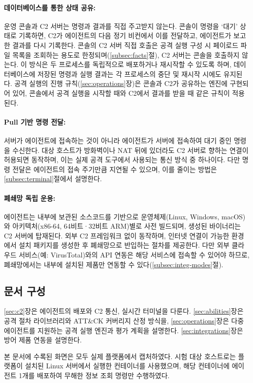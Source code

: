 \paragraph{\textbf{데이터베이스를 통한 상태 공유:}}
운영 콘솔과 C2 서버는 명령과 결과를 직접 주고받지 않는다. 콘솔이 명령을 `대기' 상태로 기록하면, C2가 에이전트의 다음 정기 비컨에서 이를 전달하고, 에이전트가 보고한 결과를 다시 기록한다.
콘솔의 C2 서버 직접 호출은 공격 실행 구성 시 페이로드 파일 목록을 조회하는 용도로 한정되며(\ref{subsec:facts}절), C2 서버는 콘솔을 호출하지 않는다.
이 방식은 두 프로세스를 독립적으로 배포하거나 재시작할 수 있도록 하며, 데이터베이스에 저장된 명령과 실행 결과는 각 프로세스의 중단 및 재시작 시에도 유지된다.
공격 실행의 진행 규칙(\ref{sec:operations}장)은 콘솔과 C2가 공유하는 엔진에 구현되어 있어, 콘솔에서 공격 실행을 시작할 때와 C2에서 결과를 받을 때 같은 규칙이 적용된다.

\paragraph{\textbf{Pull 기반 명령 전달:}}
서버가 에이전트에 접속하는 것이 아니라 에이전트가 서버에 접속하여 대기 중인 명령을 수신한다.
대상 호스트가 방화벽이나 NAT 뒤에 있더라도 C2 서버로 향하는 연결이 허용되면 동작하며, 이는 실제 공격 도구에서 사용되는 통신 방식 중 하나이다.
다만 명령 전달은 에이전트의 접속 주기만큼 지연될 수 있으며, 이를 줄이는 방법은 \ref{subsec:terminal}절에서 설명한다.

\paragraph{\textbf{폐쇄망 독립 운용:}}
에이전트는 내부에 보관된 소스코드를 기반으로 운영체제(Linux, Windows, macOS)와 아키텍처(x86-64, 64비트·32비트 ARM)별로 사전 빌드되며, 생성된 바이너리는 C2 서버에 탑재된다.
외부 C2 프레임워크 없이 동작하며, 인터넷 연결이 가능한 환경에서 설치 패키지를 생성한 후 폐쇄망으로 반입하는 절차를 제공한다.
다만 외부 클라우드 서비스(예: VirusTotal)와의 API 연동은 해당 서비스에 접속할 수 있어야 하므로, 폐쇄망에서는 내부에 설치된 제품만 연동할 수 있다(\ref{subsec:integ-modes}절).

\subsection{문서 구성}

\ref{sec:c2}장은 에이전트의 배포와 C2 통신, 실시간 터미널을 다룬다.
\ref{sec:abilities}장은 공격 절차 라이브러리와 ATT\&CK 커버리지 산정 방식을, \ref{sec:operations}장은 다중 에이전트를 지원하는 공격 실행 엔진과 평가 계획을 설명한다.
\ref{sec:integrations}장은 방어 제품 연동을 설명한다.

본 문서에 수록된 화면은 모두 실제 플랫폼에서 캡처하였다.
시험 대상 호스트로는 플랫폼이 설치된 Linux 서버에서 실행한 컨테이너를 사용했으며, 해당 컨테이너에 에이전트 1개를 배포하여 무해한 정보 조회 명령만 수행하였다.
